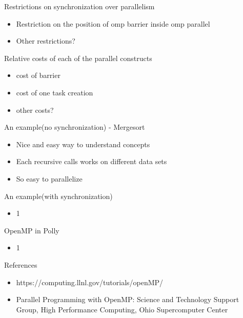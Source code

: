 \documentclass[14pt]{beamer}
\begin{document}
\begin{frame}{Restrictions on synchronization over parallelism}
\begin{itemize}
\item Restriction on the position of omp barrier inside omp parallel
\item Other restrictions?
\end{itemize}
\end{frame}

\begin{frame}{Relative costs of each of the parallel constructs}
\begin{itemize}
\item cost of barrier
\item cost of one task creation
\item other costs?
\end{itemize}
\end{frame}

\begin{frame}{An example(no synchronization) - Mergesort}
\begin{itemize}
\item Nice and easy way to understand concepts
\item Each recursive calls works on different data sets
\item So easy to parallelize
\end{itemize}
\end{frame}

\begin{frame}{An example(with synchronization)}
\begin{itemize}
\item 1
\end{itemize}
\end{frame}

\begin{frame}{OpenMP in Polly}
\begin{itemize}
\item 1
\end{itemize}
\end{frame}


\begin{frame}{References}
\begin{itemize}
\item https://computing.llnl.gov/tutorials/openMP/
\item Parallel Programming with OpenMP: Science and Technology Support Group, High Performance Computing, Ohio Supercomputer Center
\end{itemize}
\end{frame}
\end{document}
